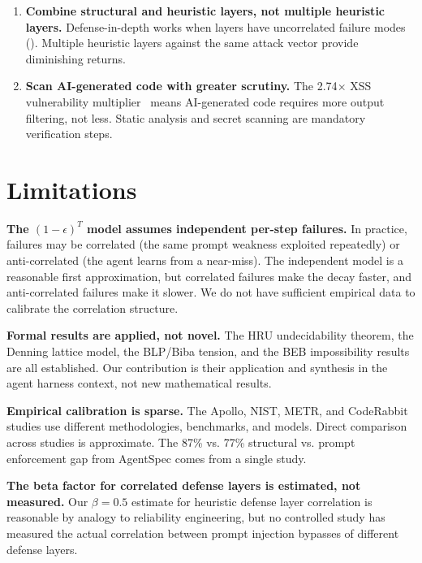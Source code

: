 \documentclass[11pt, a4paper, copyright]{googledeepmind}
\begin{document}
\begin{enumerate}
    \item \textbf{Combine structural and heuristic layers, not multiple heuristic layers.} Defense-in-depth works when layers have uncorrelated failure modes (). Multiple heuristic layers against the same attack vector provide diminishing returns.

    \item \textbf{Scan AI-generated code with greater scrutiny.} The 2.74$\times$ XSS vulnerability multiplier~\citep{coderabbit2025state} means AI-generated code requires more output filtering, not less. Static analysis and secret scanning are mandatory verification steps.
\end{enumerate}


\section{Limitations}
\label{sec:limitations}

\textbf{The $(1-\epsilon)^T$ model assumes independent per-step failures.} In practice, failures may be correlated (the same prompt weakness exploited repeatedly) or anti-correlated (the agent learns from a near-miss). The independent model is a reasonable first approximation, but correlated failures make the decay faster, and anti-correlated failures make it slower. We do not have sufficient empirical data to calibrate the correlation structure.

\textbf{Formal results are applied, not novel.} The HRU undecidability theorem, the Denning lattice model, the BLP/Biba tension, and the BEB impossibility results are all established. Our contribution is their application and synthesis in the agent harness context, not new mathematical results.

\textbf{Empirical calibration is sparse.} The Apollo, NIST, METR, and CodeRabbit studies use different methodologies, benchmarks, and models. Direct comparison across studies is approximate. The 87\% vs. 77\% structural vs. prompt enforcement gap from AgentSpec comes from a single study.

\textbf{The beta factor for correlated defense layers is estimated, not measured.} Our $\beta = 0.5$ estimate for heuristic defense layer correlation is reasonable by analogy to reliability engineering, but no controlled study has measured the actual correlation between prompt injection bypasses of different defense layers.
\end{document}
